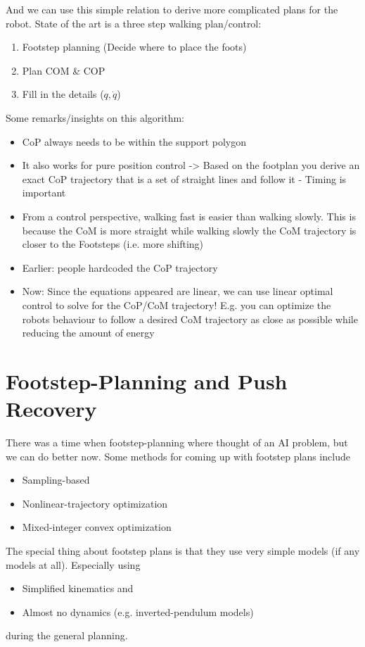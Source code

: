 And we can use this simple relation to derive more complicated plans for the robot. State of the art is a three step walking plan/control:
\begin{enumerate}
\item Footstep planning (Decide where to place the foots)
\item Plan COM \& COP
\item Fill in the details ($q,\dot{q}$)
\end{enumerate}  
Some remarks/insights on this algorithm:
\begin{itemize}
\item CoP always needs to be within the support polygon
\item It also works for pure position control -> Based on the footplan you derive an exact CoP trajectory that is a set of straight lines and follow it - Timing is important
\item From a control perspective, walking fast is easier than walking slowly. This is because the CoM is more straight while walking slowly the CoM trajectory is closer to the Footsteps (i.e. more shifting)
\item Earlier: people hardcoded the CoP trajectory
\item Now: Since the equations appeared are linear, we can use linear optimal control to solve for the CoP/CoM trajectory! E.g. you can optimize the robots behaviour to follow a desired CoM trajectory as close as possible while reducing the amount of energy
\end{itemize}


\section{Footstep-Planning and Push Recovery}
There was a time when footstep-planning where thought of an AI problem, but we can do better now. Some methods for coming up with footstep plans include
\begin{itemize}
\item Sampling-based
\item Nonlinear-trajectory optimization
\item Mixed-integer convex optimization
\end{itemize}
The special thing about footstep plans is that they use very simple models (if any models at all). Especially using
\begin{itemize}
\item Simplified kinematics and 
\item Almost no dynamics (e.g. inverted-pendulum models)
\end{itemize}
during the general planning. 

